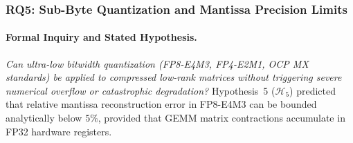 \subsubsection{RQ5: Sub-Byte Quantization and Mantissa Precision Limits}
\label{subsubsec:res_rq5}

\paragraph{Formal Inquiry and Stated Hypothesis.}
\emph{Can ultra-low bitwidth quantization (FP8-E4M3, FP4-E2M1, OCP MX standards) be applied to compressed low-rank matrices without triggering severe numerical overflow or catastrophic degradation?}
Hypothesis~5 ($\mathcal{H}_5$) predicted that relative mantissa reconstruction error in FP8-E4M3 can be bounded analytically below $5\%$, provided that GEMM matrix contractions accumulate in FP32 hardware registers.

